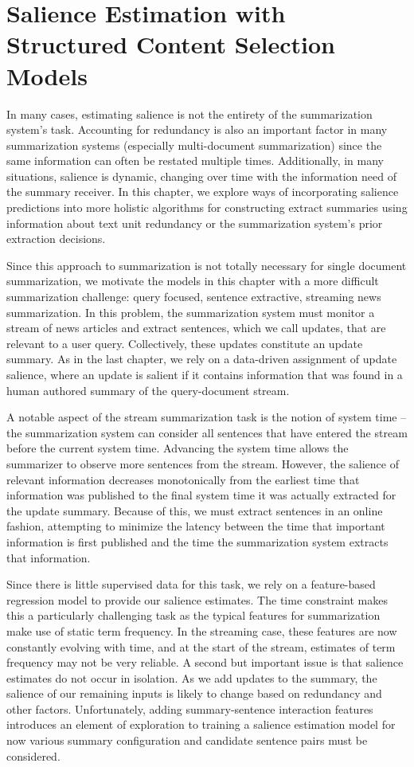 \chapter{Salience Estimation with Structured Content Selection Models}
\label{ch:mlsum}

In many cases, estimating salience is not the entirety of the
summarization system's task. Accounting for redundancy is also an important
factor in many summarization systems (especially multi-document summarization)
since the same information can often be restated multiple times. Additionally,
in many situations, salience is dynamic, changing over time with the
information need of the summary receiver.  In this chapter, we explore ways of
incorporating salience predictions into more holistic algorithms for
constructing extract summaries using information about text unit redundancy or
the summarization system's prior extraction decisions.  

Since this approach to summarization is not totally necessary for single
document summarization, we motivate the models in this chapter with a more
difficult summarization challenge: query focused, sentence extractive,
streaming news summarization.  In this problem, the summarization system must
monitor a stream of news articles and extract sentences, which we call updates,
that are relevant to a user query. Collectively, these updates constitute an
update summary.  As in the last chapter, we rely on a data-driven assignment of
update salience, where an update is salient if it contains information that was
found in a human authored summary of the query-document stream. 

A notable aspect of the stream summarization task is the notion of system time
-- the summarization system can consider all sentences that have entered the
stream before the current system time. Advancing the system time allows the
summarizer to observe more sentences from the stream. However, the salience of
relevant information decreases monotonically from the earliest time that
information was published to the final system time it was actually extracted
for the update summary.  Because of this, we must extract sentences in an
online fashion, attempting to minimize the latency between the time that
important information is first published and the time the summarization system
extracts that information.

Since there is little supervised data for this task, we rely on a feature-based
regression model to provide our salience estimates.   The time constraint makes
this a particularly challenging task as the typical features for summarization
make use of static term frequency.  In the streaming case, these features are
now constantly evolving with time, and at the start of the stream, estimates of
term frequency may not be very reliable.  A second but important issue is that
salience estimates do not occur in isolation. As we add updates to the summary,
the salience of our remaining inputs is likely to change based on redundancy
and other factors.  Unfortunately, adding summary-sentence interaction features
introduces an element of exploration to training a salience estimation model
for now various summary configuration and candidate sentence pairs must be
considered.

